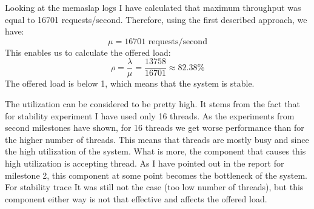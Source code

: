 \documentclass[11pt]{article}
\begin{document}


Looking at the memaslap logs I have calculated that maximum throughput was equal to 16701 requests/second. Therefore, using the first described approach, we have:
$$\mu = 16701\textrm{ requests/second}$$
This enables us to calculate the offered load:
$$\rho = \frac{\lambda}{\mu} = \frac{13758}{16701} \approx 82.38\%$$
The offered load is below 1, which means that the system is stable.

The utilization can be considered to be pretty high. It stems from the fact that for stability experiment I have used only 16 threads. As the experiments from second milestones have shown, for 16 threads we get worse performance than for the higher number of threads. This means that threads are mostly busy and since the high utilization of the system. What is more, the component that causes this high utilization is accepting thread. As I have pointed out in the report for milestone 2, this component at some point becomes the bottleneck of the system. For stability trace It was still not the case (too low number of threads), but this component either way is not that effective and affects the offered load.
\end{document}
